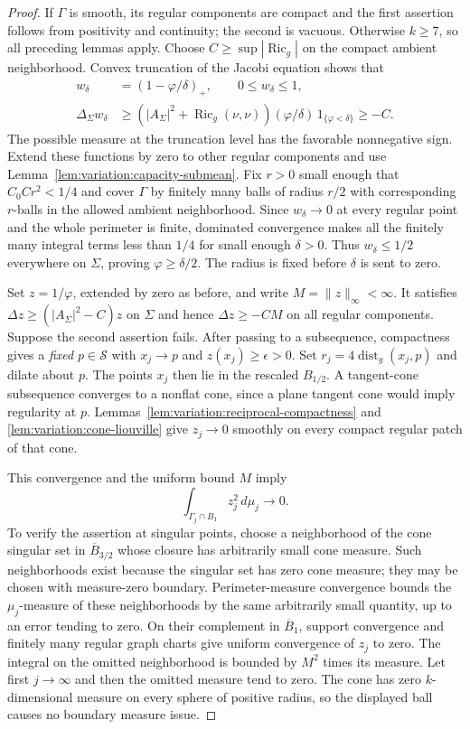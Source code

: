\begin{proof}
If $\Gamma$ is smooth, its regular components are compact and the
first assertion follows from positivity and continuity; the second
is vacuous.  Otherwise $k\geq7$, so all preceding lemmas apply.
Choose $C\geq\sup|\operatorname{Ric}_g|$ on the compact ambient
neighborhood.  Convex truncation of the Jacobi equation shows that
\[
 \begin{split}
 w_\delta&=(1-\varphi/\delta)_+,\qquad 0\leq w_\delta\leq1,\\
 \Delta_\Sigma w_\delta
 &\geq (|A_\Sigma|^2+\operatorname{Ric}_g(\nu,\nu))
       (\varphi/\delta)\,1_{\{\varphi<\delta\}}
 \geq-C.
 \end{split}
\]
The possible measure at the truncation level has the favorable
nonnegative sign.  Extend these functions by zero to other regular
components and use Lemma~\ref{lem:variation:capacity-submean}.
Fix $r>0$ small enough that $C_0Cr^2<1/4$ and cover $\Gamma$ by
finitely many balls of radius $r/2$ with corresponding $r$-balls in
the allowed ambient neighborhood.  Since $w_\delta\to0$ at every
regular point and the whole perimeter is finite, dominated
convergence makes all the finitely many integral terms less than
$1/4$ for small enough $\delta>0$.  Thus $w_\delta\leq1/2$
everywhere on $\Sigma$, proving $\varphi\geq\delta/2$.
The radius is fixed before $\delta$ is sent to zero.

Set $z=1/\varphi$, extended by zero as before, and write
$M=\|z\|_\infty<\infty$.  It satisfies
$\Delta z\geq(|A_\Sigma|^2-C)z$ on $\Sigma$ and hence
$\Delta z\geq-CM$ on all regular components.
Suppose the second assertion fails.  After passing to a subsequence,
compactness gives a \emph{fixed} $p\in\mathcal S$ with
$x_j\to p$ and $z(x_j)\geq\epsilon>0$.
Set $r_j=4\operatorname{dist}_g(x_j,p)$ and dilate about $p$.
The points $x_j$ then lie in the rescaled $B_{1/2}$.
A tangent-cone subsequence converges to a nonflat cone, since a
plane tangent cone would imply regularity at $p$.
Lemmas~\ref{lem:variation:reciprocal-compactness} and
\ref{lem:variation:cone-liouville} give $z_j\to0$ smoothly on every
compact regular patch of that cone.

This convergence and the uniform bound $M$ imply
\[
 \int_{\Gamma_j\cap B_1}z_j^2\,d\mu_j\longrightarrow0.
\]
To verify the assertion at singular points, choose a neighborhood of
the cone singular set in $\overline B_{3/2}$ whose closure has
arbitrarily small cone measure.  Such neighborhoods exist because
the singular set has zero cone measure; they may be chosen with
measure-zero boundary.  Perimeter-measure convergence bounds the
$\mu_j$-measure of these neighborhoods by the same arbitrarily small
quantity, up to an error tending to zero.  On their complement in
$\overline B_1$, support convergence and finitely many regular
graph charts give uniform convergence of $z_j$ to zero.
The integral on the omitted neighborhood is bounded by $M^2$ times
its measure.  Let first $j\to\infty$ and then the omitted measure
tend to zero.  The cone has zero $k$-dimensional measure on every
sphere of positive radius, so the displayed ball causes no boundary
measure issue.


\end{proof}
